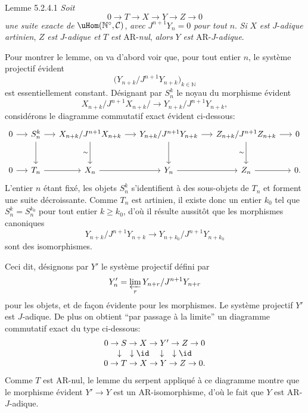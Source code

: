\begin{statement}{Lemme 5.2.4.1}
\emph{Soit}
\[
0\longrightarrow T\longrightarrow X\longrightarrow Y\longrightarrow Z\longrightarrow0
\]
\emph{une suite exacte de} \(\uHom(\mathbb{N}^\circ,\mathcal{C})\), \emph{avec} \(J^{n+1}Y_n=0\) \emph{pour tout} \(n\). \emph{Si} \(X\) \emph{est} \(J\)-\emph{adique artinien}, \(Z\) \emph{est} \(J\)-\emph{adique et} \(T\) \emph{est} AR-\emph{nul}, \emph{alors} \(Y\) \emph{est} AR-\(J\)-\emph{adique}.
\end{statement}

Pour montrer le lemme, on va d'abord voir que, pour tout entier \(n\), le système projectif évident
\[
\bigl(Y_{n+k}/J^{n+1}Y_{n+k}\bigr)_{k\in\mathbb{N}}
\]
est essentiellement constant. Désignant par \(S_n^k\) le noyau du morphisme évident
\[
X_{n+k}/J^{n+1}X_{n+k}/\longrightarrow
Y_{n+k}/J^{n+1}Y_{n+k},
\]
considérons le diagramme commutatif exact évident ci-dessous:
\[
\begin{tikzcd}[column sep=1.35em,row sep=large]
0 \arrow[r] & S_n^k \arrow[r] \arrow[d] & X_{n+k}/J^{n+1}X_{n+k} \arrow[r] \arrow[d,"\sim"'] & Y_{n+k}/J^{n+1}Y_{n+k} \arrow[r] \arrow[d] & Z_{n+k}/J^{n+1}Z_{n+k} \arrow[r] \arrow[d,"\sim"'] & 0\\
0 \arrow[r] & T_n \arrow[r] & X_n \arrow[r] & Y_n \arrow[r] & Z_n \arrow[r] & 0 .
\end{tikzcd}
\]
L'entier \(n\) étant fixé, les objets \(S_n^k\) s'identifient à des sous-objets de \(T_n\) et forment une suite décroissante. Comme \(T_n\) est artinien, il existe donc un entier \(k_0\) tel que \(S_n^k=S_n^{k_0}\) pour tout entier \(k\ge k_0\), d'où il résulte aussitôt que les morphismes canoniques
\[
Y_{n+k}/J^{n+1}Y_{n+k}
\longrightarrow
Y_{n+k_0}/J^{n+1}Y_{n+k_0}
\]
sont des isomorphismes.

Ceci dit, désignons par \(Y'\) le système projectif défini par
\[
Y'_n=\varprojlim_r Y_{n+r}/J^{n+1}Y_{n+r}
\]
pour les objets, et de façon évidente pour les morphismes. Le système projectif \(Y'\) est \(J\)-adique. De plus on obtient ``par passage à la limite'' un diagramme commutatif exact du type ci-dessous:
\[
\begin{array}{ccccc}
0\to S\to X\to Y'\to Z\to0\\
\downarrow\quad\downarrow\id\quad\downarrow\quad\downarrow\id\\
0\to T\to X\to Y\to Z\to0 .
\end{array}
\]
Comme \(T\) est AR-nul, le lemme du serpent appliqué à ce diagramme montre que le morphisme évident \(Y'\to Y\) est un AR-isomorphisme, d'où le fait que \(Y\) est AR-\(J\)-adique.

